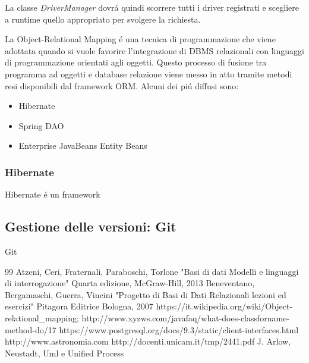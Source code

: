 \documentclass[12pt,a4paper,onecolumn]{article}
\begin{document}
				\begin{flushleft}
					La classe \textit{DriverManager} dovr\'{a} quindi scorrere tutti i driver registrati e scegliere a runtime quello appropriato per svolgere la richiesta.\newline
					
						La Object-Relational Mapping \'{e} una tecnica di programmazione che viene adottata quando si vuole favorire l'integrazione di DBMS relazionali con linguaggi di programmazione orientati agli oggetti. Questo processo di fusione tra programma ad oggetti e database relazione viene messo in atto tramite metodi resi disponibili dal framework ORM. Alcuni dei pi\'{u} diffusi sono:
						
						\begin{itemize}
							\item Hibernate
							\item Spring DAO
							\item Enterprise JavaBeans Entity Beans
						\end{itemize}		
				\end{flushleft}
		
		
			\subsubsection{Hibernate}
				\begin{flushleft}
					Hibernate \'{e} un framework
				\end{flushleft}
	\newpage

	\subsection{Gestione delle versioni: Git}
		\begin{flushleft}
			Git
		\end{flushleft}



\newpage
\renewcommand\refname{Bibliografia}
\begin{thebibliography} {99}
	 Atzeni, Ceri, Fraternali, Paraboschi, Torlone
	"Basi di dati Modelli e linguaggi di interrogazione"
	Quarta edizione, McGraw-Hill, 2013
	 Beneventano, Bergamaschi, Guerra, Vincini "Progetto di Basi di Dati Relazionali lezioni ed esercizi"
	Pitagora Editrice Bologna, 2007
	 https://it.wikipedia.org/wiki/Object-relational\_mapping;
	 http://www.xyzws.com/javafaq/what-does-classforname-method-do/17
	 https://www.postgresql.org/docs/9.3/static/client-interfaces.html
	http://www.astronomia.com
	http://docenti.unicam.it/tmp/2441.pdf
	 J. Arlow, Neustadt, Uml e Unified Process
\end{thebibliography}
\end{document}
